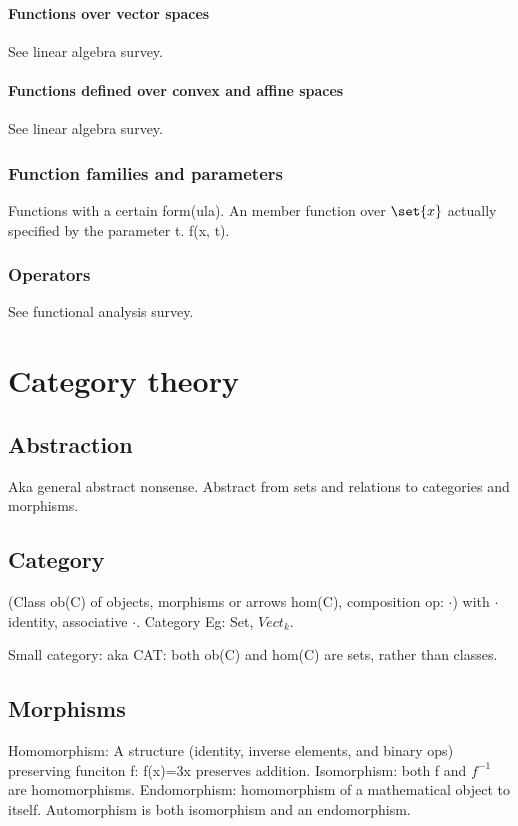 \documentclass[oneside, article]{memoir}
\begin{document}
\subsubsection{Functions over vector spaces}
See linear algebra survey.

\subsubsection{Functions defined over convex and affine spaces}
See linear algebra survey.

\subsection{Function families and parameters}
Functions with a certain form(ula). An member function over $\set{x}$ actually specified by the parameter t. f(x, t).

\subsection{Operators}
See functional analysis survey.

\chapter{Category theory}
\section{Abstraction}
Aka general abstract nonsense. Abstract from sets and relations to categories and morphisms.

\section{Category}
(Class ob(C) of objects, morphisms or arrows hom(C), composition op: $\cdot$) with $\cdot$ identity, associative $\cdot$. Category Eg: Set, $Vect_{k}$.

Small category: aka CAT: both ob(C) and hom(C) are sets, rather than classes.

\section{Morphisms}
Homomorphism: A structure (identity, inverse elements, and binary ops) preserving funciton f: f(x)=3x preserves addition. Isomorphism: both f and $f^{-1}$ are homomorphisms. Endomorphism: homomorphism of a mathematical object to itself. Automorphism is both isomorphism and an endomorphism.
\end{document}
